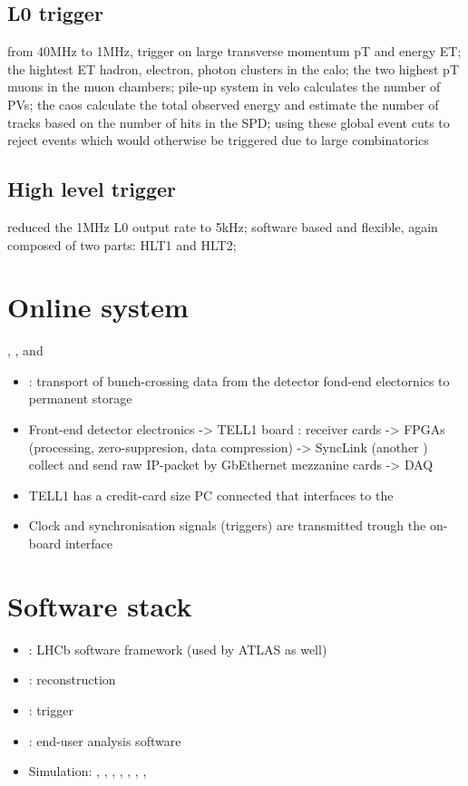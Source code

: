 \subsection{L0 trigger}
from 40MHz to 1MHz, trigger on large transverse momentum pT and energy ET; the hightest ET hadron, electron, photon clusters in the calo; the two highest pT muons in the muon chambers; pile-up system in velo calculates the number of PVs; the caos calculate the total observed energy and estimate the number of tracks based on the number of hits in the SPD; using these global event cuts to reject events which would otherwise be triggered due to large combinatorics
\subsection{High level trigger}
reduced the 1MHz L0 output rate to 5kHz; software based and flexible, again composed of two parts: HLT1 and HLT2; 
\section{Online system}
\DAQ, \TFC, and \ECS
\begin{itemize}
  \item \DAQ: transport of bunch-crossing data from the detector fond-end electornics to permanent storage
  \item Front-end detector electronics -> TELL1 board : receiver cards -> \acp{FPGA} (processing, zero-suppresion, data compression) -> SyncLink (another \FPGA) collect and send raw IP-packet by GbEthernet mezzanine cards -> DAQ
  \item TELL1 has a credit-card size PC connected that interfaces to the \ECS
  \item Clock and synchronisation signals (\eg triggers) are transmitted trough the on-board \TTC interface
\end{itemize}

\section{Software stack}
\begin{itemize}
  \item \Gaudi: LHCb software framework (used by ATLAS as well)
  \item \Brunel: reconstruction
  \item \Brunel: trigger
  \item \DaVinci: end-user analysis software
  \item Simulation: \Gauss, \Boole, \Pythia, \EvtGen, \Photos, \Herwigpp, \Sherpa, \GeantFour
\end{itemize}

